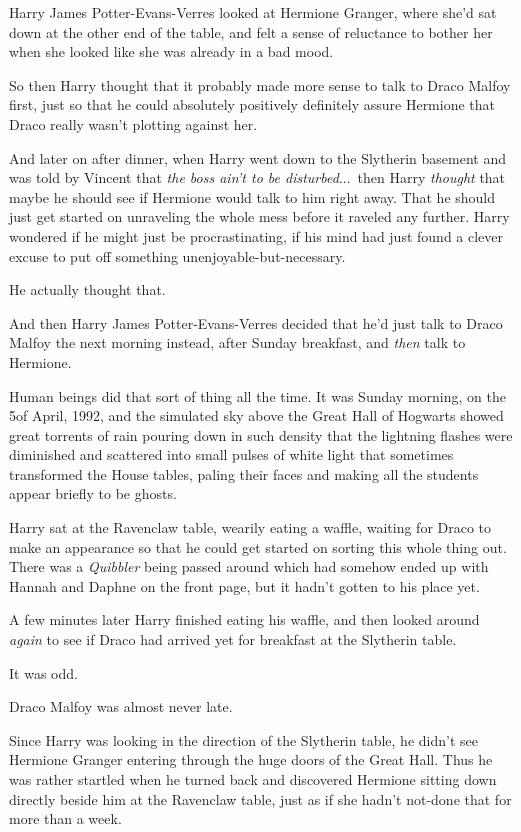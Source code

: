 Harry James Potter-Evans-Verres looked at Hermione Granger,
where she’d sat down at the other end of the table, and felt a
sense of reluctance to bother her when she looked like she was
already in a bad mood.

So then Harry thought that it probably made more sense to talk
to Draco Malfoy first, just so that he could absolutely positively
definitely assure Hermione that Draco really wasn’t plotting
against her.

And later on after dinner, when Harry went down to the Slytherin
basement and was told by Vincent that \emph{the boss ain’t to be
disturbed}...\ then Harry \emph{thought} that maybe he should see
if Hermione would talk to him right away. That he should just get
started on unraveling the whole mess before it raveled any further.
Harry wondered if he might just be procrastinating, if his mind had
just found a clever excuse to put off something
unenjoyable-but-necessary.

He actually thought that.

And then Harry James Potter-Evans-Verres decided that he’d just
talk to Draco Malfoy the next morning instead, after Sunday
breakfast, and \emph{then} talk to Hermione.

Human beings did that sort of thing all the time.
\sbreak
It was Sunday morning, on the 5\Th of April, 1992, and the
simulated sky above the Great Hall of Hogwarts showed great
torrents of rain pouring down in such density that the lightning
flashes were diminished and scattered into small pulses of white
light that sometimes transformed the House tables, paling their
faces and making all the students appear briefly to be ghosts.

Harry sat at the Ravenclaw table, wearily eating a waffle,
waiting for Draco to make an appearance so that he could get
started on sorting this whole thing out. There was a
\emph{Quibbler} being passed around which had somehow ended up with
Hannah and Daphne on the front page, but it hadn’t gotten to his
place yet.

A few minutes later Harry finished eating his waffle, and then
looked around \emph{again} to see if Draco had arrived yet for
breakfast at the Slytherin table.

It was odd.

Draco Malfoy was almost never late.

Since Harry was looking in the direction of the Slytherin table,
he didn’t see Hermione Granger entering through the huge doors of
the Great Hall. Thus he was rather startled when he turned back and
discovered Hermione sitting down directly beside him at the
Ravenclaw table, just as if she hadn’t not-done that for more than
a week.


